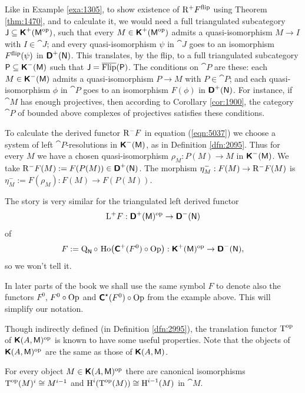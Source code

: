 \begin{exa}
Like in Example \ref{exa:1305}, to show existence of $\mathrm{R}^+ F^{\mathrm{flip}}$ 
using Theorem \ref{thm:1470},
and to calculate it, we would need a full triangulated subcategory 
$\operatorname{\mathsf{J}} \subseteq \boldsymbol{\mathsf{K}}^+(\operatorname{\mathsf{M}}^{\mathrm{op}})$, 
such that every $M \in \boldsymbol{\mathsf{K}}^+(\operatorname{\mathsf{M}}^{\mathrm{op}})$
admits a quasi-isomorphism 
$M \to I$ with $I \in \cat{J}$; and 
every quasi-isomorphism $\psi$ in $\cat{J}$ goes to an isomorphism 
$F^{\mathrm{flip}}(\psi)$ in $\boldsymbol{\mathsf{D}}^+(\operatorname{\mathsf{N}})$.
This translates, by the flip, to a full triangulated subcategory
$\operatorname{\mathsf{P}} \subseteq \boldsymbol{\mathsf{K}}^-(\operatorname{\mathsf{M}})$ such that 
$\operatorname{\mathsf{J}} = \overline{\operatorname{Flip}}(\operatorname{\mathsf{P}})$. 
The conditions on $\cat{P}$ are these: 
each $M \in \boldsymbol{\mathsf{K}}^-(\operatorname{\mathsf{M}})$
admits a quasi-isomorphism 
$P \to M$ with $P \in \cat{P}$; and each quasi-isomorphism $\phi$ 
in $\cat{P}$ goes to an isomorphism
$F(\phi)$ in $\boldsymbol{\mathsf{D}}^+(\operatorname{\mathsf{N}})$.
For instance, if $\cat{M}$ has enough projectives, then according to Corollary 
\ref{cor:1900}, the category $\cat{P}$ of bounded above complexes of 
projectives satisfies these conditions. 

To calculate the derived functor $\mathrm{R}^- F$ in equation (\ref{eqn:5037}) we 
choose a system of left $\cat{P}$-resolutions 
in $\boldsymbol{\mathsf{K}}^-(\operatorname{\mathsf{M}})$, as in Definition \ref{dfn:2095}. 
Thus for every $M$ we have a chosen quasi-isomorphism 
$\rho_M : P(M) \to M$ in $\boldsymbol{\mathsf{K}}^{-}(\operatorname{\mathsf{M}})$. We take
$\mathrm{R}^- F(M) := F(P(M)) \in \boldsymbol{\mathsf{D}}^+(\operatorname{\mathsf{N}})$.
The morphism
$\eta^{-}_M : F(M) \to \mathrm{R}^- F(M)$
is 
$\eta^{-}_M := F(\rho_M) : F(M) \to F(P(M))$.

The story is very similar for the triangulated left derived functor 
\[ \mathrm{L}^+ F : \boldsymbol{\mathsf{D}}^+(\operatorname{\mathsf{M}})^{\mathrm{op}} \to \boldsymbol{\mathsf{D}}^-(\operatorname{\mathsf{N}})  \]
of 
\[ F := \operatorname{Q}_{\operatorname{\mathsf{N}}} \circ \, 
\operatorname{Ho} \bigl( \boldsymbol{\mathsf{C}}^+(F^0) \circ \operatorname{Op} \bigr) : 
\boldsymbol{\mathsf{K}}^+(\operatorname{\mathsf{M}})^{\mathrm{op}} \to 
\boldsymbol{\mathsf{D}}^-(\operatorname{\mathsf{N}}) , \]
so we won't tell it. 
\end{exa}

In later parts of the book we shall use the same symbol $F$ to denote also the 
functors $F^0$, $F^0 \circ \operatorname{Op}$ and  
$\boldsymbol{\mathsf{C}}^{\star}(F^0) \circ \operatorname{Op}$
from the example above. This will simplify our notation. 

Though indirectly defined (in Definition \ref{dfn:2995}), the  translation 
functor $\operatorname{T}^{\mathrm{op}}$
of $\boldsymbol{\mathsf{K}}(A, \operatorname{\mathsf{M}})^{\mathrm{op}}$
is known to have some useful properties. Note that the objects of 
$\boldsymbol{\mathsf{K}}(A, \operatorname{\mathsf{M}})^{\mathrm{op}}$ are the same as those of 
$\boldsymbol{\mathsf{K}}(A, \operatorname{\mathsf{M}})$. 

\begin{prop} \label{prop:2307}
For every object $M \in \boldsymbol{\mathsf{K}}(A, \operatorname{\mathsf{M}})^{\mathrm{op}}$ there are canonical 
isomorphisms 
$\operatorname{T}^{\mathrm{op}}(M)^i \cong M^{i - 1}$
and 
$\operatorname{H}^i(\operatorname{T}^{\mathrm{op}}(M)) \cong \operatorname{H}^{i - 1}(M)$
in $\cat{M}$. 
\end{prop}

